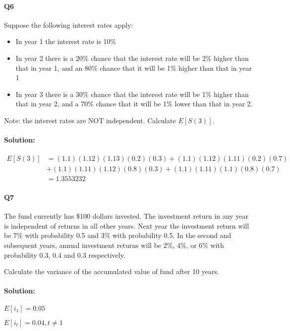 \documentclass[a4paper, 11pt, twoside]{article}
\begin{document}
\paragraph{Q6} Suppose the following interest rates apply:

\begin{itemize}
	\item In year 1 the interest rate is 10\%
	\item In year 2 there is a 20\% chance that the interest rate will be 2\% higher than that in year 1, and an 80\% chance that it will be 1\% higher than that in year 1
	\item In year 3 there is a 30\% chance that the interest rate will be 1\% higher than that in year 2, and a 70\% chance that it will be 1\% lower than that in year 2.
\end{itemize}

Note: the interest rates are NOT independent. Calculate $E[S(3)]$.

\paragraph{Solution:}

\[\begin{split}
	E[S(3)] &= (1.1)(1.12)(1.13)(0.2)(0.3)+(1.1)(1.12)(1.11)(0.2)(0.7)\\&+(1.1)(1.11)(1.12)(0.8)(0.3)+(1.1)(1.11)(1.1)(0.8)(0.7)\\&=1.3553232	
\end{split}
\]

\paragraph{Q7} The fund currently has \$100 dollars invested. The investment return in any year is independent of returns in all other years. Next year the investment return will be 7\% with probability 0.5 and 3\% with probability 0.5. In the second and subsequent years, annual investment returns will be 2\%, 4\%, or 6\% with probability 0.3, 0.4 and 0.3 respectively.

Calculate the variance of the accumulated value of fund after 10 years.

\paragraph{Solution:}

$E[i_1]=0.05$

$E[i_t]=0.04, t\not=1$
\end{document}

